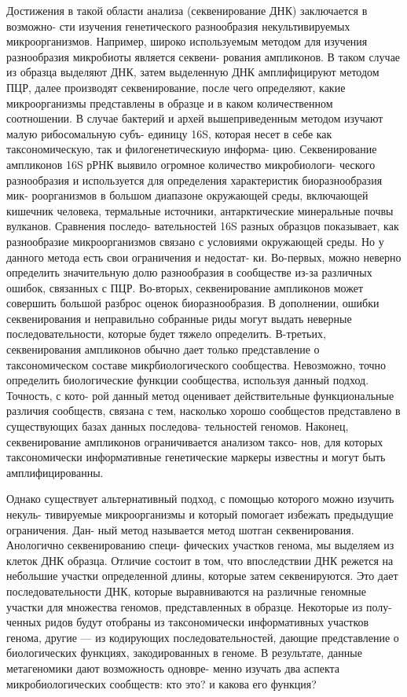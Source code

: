 Достижения в такой области анализа (секвенирование ДНК) заключается в возможно-
сти изучения генетического разнообразия некультивируемых микроорганизмов. Например,
широко используемым методом для изучения разнообразия микробиоты является секвени-
рования ампликонов. В таком случае из образца выделяют ДНК, затем выделенную ДНК
амплифицируют методом ПЦР, далее производят секвенирование, после чего определяют,
какие микроорганизмы представлены в образце и в каком количественном соотношении. В
случае бактерий и архей вышеприведенным методом изучают малую рибосомальную субъ-
единицу 16S, которая несет в себе как таксономическую, так и филогенетическиую информа-
цию. Секвенирование ампликонов 16S рРНК выявило огромное количество микробиологи-
ческого разнообразия и используется для определения характеристик биоразнообразия мик-
роорганизмов в большом диапазоне окружающей среды, включающей кишечник человека,
термальные источники, антарктические минеральные почвы вулканов. Сравнения последо-
вательностей 16S разных образцов показывает, как разнообразие микроорганизмов связано
с условиями окружающей среды. Но у данного метода есть свои ограничения и недостат-
ки. Во-первых, можно неверно определить значительную долю разнообразия в сообществе
из-за различных ошибок, связанных с ПЦР. Во-вторых, секвенирование ампликонов может
совершить большой разброс оценок биоразнообразия. В дополнении, ошибки секвенирования и неправильно собранные риды могут выдать неверные последовательности, которые
будет тяжело определить. В-третьих, секвенирования ампликонов обычно дает только представление о таксономическом составе микрбиологического сообщества. Невозможно, точно
определить биологические функции сообщества, используя данный подход. Точность, с кото-
рой данный метод оценивает действительные функциональные различия сообществ, связана
с тем, насколько хорошо сообщестов представлено в существующих базах данных последова-
тельностей геномов. Наконец, секвенирование ампликонов ограничивается анализом таксо-
нов, для которых таксономически информативные генетические маркеры известны и могут
быть амплифицированны.

Однако существует альтернативный подход, с помощью которого можно изучить некуль-
тивируемые микроорганизмы и который помогает избежать предыдущие ограничения. Дан-
ный метод называется метод шотган секвенирования. Анологично секвенированию специ-
фических участков генома, мы выделяем из клеток ДНК образца. Отличие состоит в том,
что впоследствии ДНК режется на небольшие участки определенной длины, которые затем
секвенируются. Это дает последовательности ДНК, которые выравниваются на различные
геномные участки для множества геномов, представленных в образце. Некоторые из полу-
ченных ридов будут отобраны из таксономически информативных участков генома, другие
— из кодирующих последовательностей, дающие представление о биологических функциях,
закодированных в геноме. В результате, данные метагеномики дают возможность одновре-
менно изучать два аспекта микробиологических сообществ: кто это? и какова его функция?

